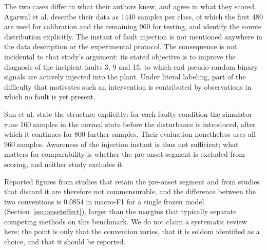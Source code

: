 \documentclass[12pt,a4paper]{article}
\begin{document}
\begin{table}[t]
\centering
\caption{Treatment of the pre-onset window in observation-level studies on the
Tennessee Eastman benchmark. The column distinguishes studies that do not
mention the injection instant from those that state it and nonetheless score
the pre-onset segment against the fault label.}
\label{tab:survey}
\small
\setlength{\tabcolsep}{4pt}
\end{table}

The two cases differ in what their authors knew, and agree in what they
scored. Agarwal et al. \cite{agarwal2022lstm} describe their data as 1440
samples per class, of which the first 480 are used for calibration and the
remaining 960 for testing, and identify the source distribution explicitly. The
instant of fault injection is not mentioned anywhere in the data description or
the experimental protocol. The consequence is not incidental to that study's
argument: its stated objective is to improve the diagnosis of the incipient
faults 3, 9 and 15, to which end pseudo-random binary signals are actively
injected into the plant. Under literal labeling, part of the difficulty that
motivates such an intervention is contributed by observations in which no fault
is yet present.

Sun et al. \cite{sun2020brnn} state the structure explicitly: for each faulty
condition the simulator runs 160 samples in the normal state before the
disturbance is introduced, after which it continues for 800 further samples.
Their evaluation nonetheless uses all 960 samples. Awareness of the injection
instant is thus not sufficient; what matters for comparability is whether the
pre-onset segment is excluded from scoring, and neither study excludes it.

Reported figures from studies that retain the pre-onset segment and from
studies that discard it are therefore not commensurable, and the difference
between the two conventions is 0.0854 in macro-F1 for a single frozen model
(Section~\ref{sec:onseteffect}), larger than the margins that typically
separate competing methods on this benchmark. We do not claim a systematic
review here; the point is only that the convention varies, that it is seldom
identified as a choice, and that it should be reported.
\end{document}
